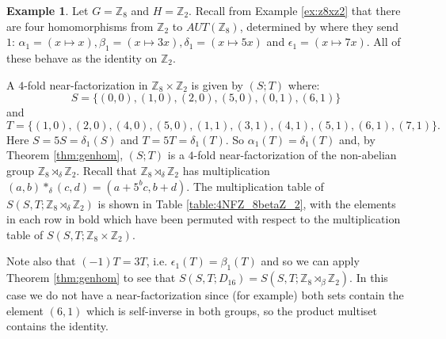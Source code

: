 \documentclass[12pt, a4paper]{article}
\theoremstyle{definition}
\newtheorem{example}[theorem]{Example}
\begin{document}
\begin{example}\label{ex:4NFZ8xZ2}
Let $G=\mathbb{Z}_8$ and $H=\mathbb{Z}_2$. Recall from Example \ref{ex:z8xz2} that there are four homomorphisms from $\mathbb{Z}_2$ to $AUT(\mathbb{Z}_8)$, determined by where they send $1$: $\alpha_1=(x \mapsto x), \beta_1=(x \mapsto 3x), \delta_1=(x \mapsto 5x)$ and $\epsilon_1=(x \mapsto 7x)$. All of these behave as the identity on $\mathbb{Z}_2$.

A $4$-fold near-factorization in $\mathbb{Z}_8 \times \mathbb{Z}_2$ is given by $(S;T)$ where:
$$S=\{(0,0),(1,0),(2,0),(5,0),(0,1),(6,1)\}$$ 
and 
$$ T=\{(1,0),(2,0),(4,0),(5,0),(1,1),(3,1),(4,1),(5,1),(6,1),(7,1)\}.$$
Here $S=5S=\delta_1(S)$ and $T=5T=\delta_1(T)$.  So $\alpha_1(T)=\delta_1(T)$ and, by Theorem \ref{thm:genhom}, $(S;T)$ is a $4$-fold near-factorization of the non-abelian group $\mathbb{Z}_8 \rtimes_{\delta} \mathbb{Z}_2$.  Recall that $\mathbb{Z}_8 \rtimes_{\delta} \mathbb{Z}_2$ has multiplication $(a,b) *_{\delta}(c,d)=(a+5^b c, b+d)$.  The multiplication table of $S(S,T; \mathbb{Z}_8 \rtimes_{\delta} \mathbb{Z}_2)$ is shown in Table \ref{table:4NFZ_8betaZ_2}, with the elements in each row in bold which have been permuted with respect to the multiplication table of $S(S,T; \mathbb{Z}_8 \times \mathbb{Z}_2)$.

Note also that $(-1)T=3T$, i.e. $\epsilon_1(T)=\beta_1(T)$ and so we can apply Theorem \ref{thm:genhom} to see that $S(S,T; D_{16})=S(S,T; \mathbb{Z}_8 \rtimes_{\beta} \mathbb{Z}_2)$.  In this case we do not have a near-factorization since (for example) both sets contain the element $(6,1)$ which is self-inverse in both groups, so the product multiset contains the identity.
\end{example}
\end{document}
